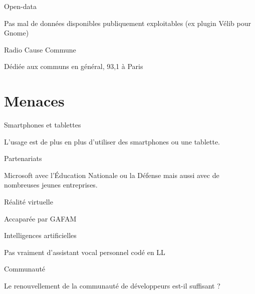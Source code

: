 \documentclass[xcolor=svgnames]{beamer}
\begin{document}
    \begin{frame}{Open-data}
    
        Pas mal de données disponibles publiquement exploitables (ex plugin Vélib pour Gnome)
        
    \end{frame}
    
    \begin{frame}{Radio Cause Commune}
    
        Dédiée aux communs en général, 93,1 à Paris
        
    \end{frame}
    
\section{Menaces}

    \begin{frame}{Smartphones et tablettes}
    
        L’usage est de plus en plus d’utiliser des smartphones ou une tablette.
        
    \end{frame}
    
    \begin{frame}{Partenariats}
    
        Microsoft avec l’Éducation Nationale ou la Défense \pause
        mais aussi avec de nombreuses jeunes entreprises.
        
    \end{frame}
    
    \begin{frame}{Réalité virtuelle}
    
        Accaparée par GAFAM
        
    \end{frame}
    
    \begin{frame}{Intelligences artificielles}
    
        Pas vraiment d’assistant vocal personnel codé en LL
        
    \end{frame}
    
    \begin{frame}{Communauté}
    
        Le renouvellement de la communauté de développeurs est-il suffisant ?
        
    \end{frame}
    
\end{document}
